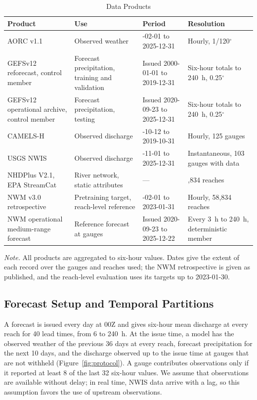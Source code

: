 \begin{table}
\caption{Data Products}
\label{tab:data}
\footnotesize
\setlength{\parindent}{0pt}
\renewcommand{\arraystretch}{1.3}
\setlength{\tabcolsep}{3pt}
\begin{tabular}{@{}>{\raggedright\arraybackslash}p{} >{\raggedright\arraybackslash}p{} >{\raggedright\arraybackslash}p{} >{\raggedright\arraybackslash}p{}@{}}
\toprule
\textbf{Product} & \textbf{Use} & \textbf{Period} & \textbf{Resolution} \\
\midrule
AORC v1.1 & Observed weather & 1979-02-01 to 2025-12-31 & Hourly, 1/120$^\circ$ \\
\addlinespace
GEFSv12 reforecast, control member & Forecast precipitation, training and validation & Issued 2000-01-01 to 2019-12-31 & Six-hour totals to 240~h, 0.25$^\circ$ \\
\addlinespace
GEFSv12 operational archive, control member & Forecast precipitation, testing & Issued 2020-09-23 to 2025-12-31 & Six-hour totals to 240~h, 0.25$^\circ$ \\
\addlinespace
CAMELS-H & Observed discharge & 1984-10-12 to 2019-10-31 & Hourly, 125 gauges \\
\addlinespace
USGS NWIS & Observed discharge & 2019-11-01 to 2025-12-31 & Instantaneous, 103 gauges with data \\
\addlinespace
NHDPlus V2.1, EPA StreamCat & River network, static attributes & --- & 58,834 reaches \\
\addlinespace
NWM v3.0 retrospective & Pretraining target, reach-level reference & 1979-02-01 to 2023-01-31 & Hourly, 58,834 reaches \\
\addlinespace
NWM operational medium-range forecast & Reference forecast at gauges & Issued 2020-09-23 to 2025-12-22 & Every 3~h to 240~h, deterministic member \\
\bottomrule
\end{tabular}
\begin{flushleft}
\footnotesize \emph{Note.} All products are aggregated to six-hour values. Dates give the extent of each record over the gauges and reaches used; the NWM retrospective is given as published, and the reach-level evaluation uses its targets up to 2023-01-30.
\end{flushleft}
\end{table}

\subsection{Forecast Setup and Temporal Partitions}
\label{sec:protocol}
A forecast is issued every day at 00Z and gives six-hour mean discharge at every reach for 40 lead times, from 6 to 240~h. At the issue time, a model has the observed weather of the previous 36 days at every reach, forecast precipitation for the next 10 days, and the discharge observed up to the issue time at gauges that are not withheld (Figure~\ref{fig:protocol}). A gauge contributes observations only if it reported at least 8 of the last 32 six-hour values. We assume that observations are available without delay; in real time, NWIS data arrive with a lag, so this assumption favors the use of upstream observations.

